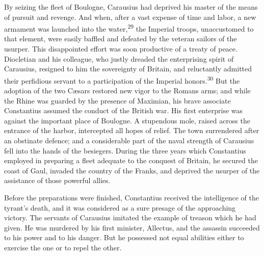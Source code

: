 By seizing the fleet of Boulogne, Carausius had deprived his
master of the means of pursuit and revenge. And when, after a
vast expense of time and labor, a new armament was launched into
the water,\textsuperscript{29} the Imperial troops, unaccustomed to that element,
were easily baffled and defeated by the veteran sailors of the
usurper. This disappointed effort was soon productive of a treaty
of peace. Diocletian and his colleague, who justly dreaded the
enterprising spirit of Carausius, resigned to him the sovereignty
of Britain, and reluctantly admitted their perfidious servant to
a participation of the Imperial honors.\textsuperscript{30} But the adoption of
the two Cæsars restored new vigor to the Romans arms; and while
the Rhine was guarded by the presence of Maximian, his brave
associate Constantius assumed the conduct of the British war. His
first enterprise was against the important place of Boulogne. A
stupendous mole, raised across the entrance of the harbor,
intercepted all hopes of relief. The town surrendered after an
obstinate defence; and a considerable part of the naval strength
of Carausius fell into the hands of the besiegers. During the
three years which Constantius employed in preparing a fleet
adequate to the conquest of Britain, he secured the coast of
Gaul, invaded the country of the Franks, and deprived the usurper
of the assistance of those powerful allies.



Before the preparations were finished, Constantius received the
intelligence of the tyrant’s death, and it was considered as a
sure presage of the approaching victory. The servants of
Carausius imitated the example of treason which he had given. He
was murdered by his first minister, Allectus, and the assassin
succeeded to his power and to his danger. But he possessed not
equal abilities either to exercise the one or to repel the other.

